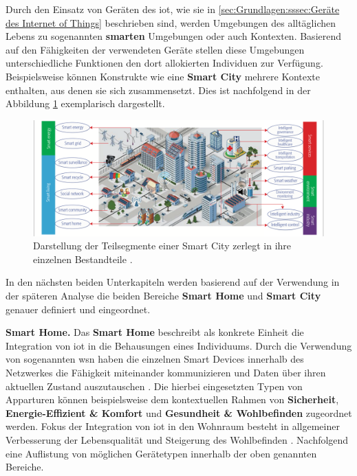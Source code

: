 Durch den Einsatz von Geräten des \ac{iot}, wie sie in \ref{sec:Grundlagen:sssec:Geräte des Internet of Things} beschrieben sind, werden Umgebungen des alltäglichen Lebens zu sogenannten \textbf{smarten} Umgebungen oder auch Kontexten. Basierend auf den Fähigkeiten der verwendeten Geräte stellen diese Umgebungen unterschiedliche Funktionen den dort allokierten Individuen zur Verfügung. Beispielsweise können Konstrukte wie eine \textbf{Smart City} mehrere Kontexte enthalten, aus denen sie sich zusammensetzt. Dies ist nachfolgend in der Abbildung \ref{fig:smart-applications} exemplarisch dargestellt.

\begin{figure}
\includegraphics[width=\textwidth]{fundamentals/pictures/Smart_Applications}
\caption{Darstellung der Teilsegmente einer Smart City zerlegt in ihre einzelnen Bestandteile \cite{Zhang2017}.}
\label{fig:smart-applications}
\end{figure}

\noindent In den nächsten beiden Unterkapiteln werden basierend auf der Verwendung in der späteren Analyse die beiden Bereiche \textbf{Smart Home} und \textbf{Smart City} genauer definiert und eingeordnet.


\noindent \textbf{Smart Home.}
Das \textbf{Smart Home} beschreibt als konkrete Einheit die Integration von \ac{iot} in die Behausungen eines Individuums. Durch die Verwendung von sogenannten \acl{wsn} haben die einzelnen Smart Devices innerhalb des Netzwerkes die Fähigkeit miteinander kommunizieren und Daten über ihren aktuellen Zustand auszutauschen \cite{Biljana2017}. Die hierbei eingesetzten Typen von Apparturen können beispielsweise dem kontextuellen Rahmen von \textbf{Sicherheit}, \textbf{Energie-Effizient \& Komfort} und \textbf{Gesundheit \& Wohlbefinden} zugeordnet werden. Fokus der Integration von \ac{iot} in den Wohnraum besteht in allgemeiner Verbesserung der Lebensqualität und Steigerung des Wohlbefinden \cite{Bastos2018}. Nachfolgend eine Auflistung von möglichen Gerätetypen innerhalb der oben genannten Bereiche.

